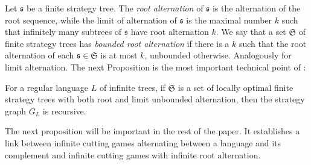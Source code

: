 Let $\mathfrak{s}$ be a finite strategy tree. The \emph{root alternation} of $\mathfrak{s}$ is the alternation of the root sequence, while the limit of alternation of $\mathfrak{s}$ is the maximal number $k$ such that infinitely many subtrees of $\mathfrak{s}$ have root alternation $k$. We say that a set  $\mathfrak{S}$ of finite strategy trees has \emph{bounded root alternation} if there is a  $k$ such that the root alternation of each $\mathfrak{s} \in \mathfrak{S}$ is at most $k$, unbounded otherwise. Analogously for limit alternation.
The next Proposition is the most important technical point of \cite{bp}:
\begin{proposition}[\cite{bp}]\label{prop:locality}
 For a regular language $L$ of infinite trees, if $\mathfrak{S}$ is a set of locally optimal finite strategy trees with both root and limit unbounded alternation, then the strategy graph $G_L$ is recursive.
 \end{proposition}
 
The next proposition will be important in the rest of the paper. It establishes a link between infinite cutting games alternating between a language and its complement and infinite cutting games with infinite root alternation.

